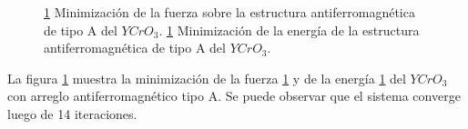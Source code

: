 \begin{figure}[H]
    \centering
    \singlespace
    \caption[Minimizaci\'on de la fuerza y la energ\'ia del $YCrO_{3}$ con 
    arreglo antiferromagn\'etico tipo 
    A]{\ref{minimizacion_yco_A}  Minimizaci\'on de la 
        fuerza sobre la estructura antiferromagn\'etica de tipo A del 
        $YCrO_{3}$. 
        \ref{minimizacion_yco_A}  Minimizaci\'on de la 
        energ\'ia de la estructura antiferromagn\'etica de tipo A del 
        $YCrO_{3}$.}
    \label{minimizacion_yco_A}
\end{figure}

\noindent La figura \ref{minimizacion_yco_A} muestra la minimizaci\'on de la 
fuerza \ref{minimizacion_yco_A}  y de la energ\'ia 
\ref{minimizacion_yco_A}  del $YCrO_{3}$ con arreglo 
antiferromagn\'etico tipo A. Se puede observar que el sistema converge luego de 
14 iteraciones.



